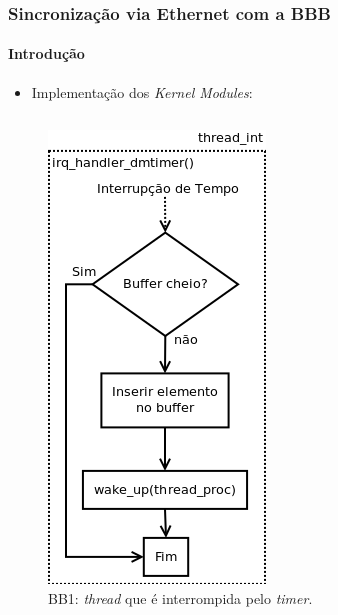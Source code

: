 \documentclass{beamer}
\begin{document}
\begin{frame}
\frametitle{Sincronização via Ethernet com a BBB }
\framesubtitle{Introdução}
\begin{itemize}
  \item Implementação dos \textit{Kernel Modules}:
\end{itemize}

\vspace{-12pt}

\begin{columns}

\begin{column}{.33\textwidth}

\begin{figure}[h!]
	
  \centering
  \includegraphics[scale=0.260]{image/thread_int}
  \caption{\centering BB1: \textit{thread} que é interrompida pelo
  \textit{timer}.}
  \label{fig:thread_int}
\end{figure}
\end{column}
		  
\begin{column}{.33\textwidth}


\end{column}
\end{columns}
\end{frame}
\end{document}
